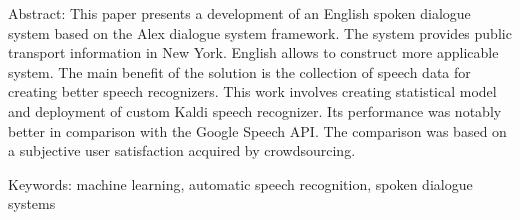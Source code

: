 \documentclass[12pt,a4paper]{report}
\let\openright=\clearpage
\def\chapwithtoc#1{
\chapter*{#1}
\addcontentsline{toc}{chapter}{#1}
}
\begin{document}
{Abstract:
This paper presents a development of an English spoken dialogue system based on the Alex dialogue system framework.
The system provides public transport information in New York.
English allows to construct more applicable system.
The main benefit of the solution is the collection of speech data for creating better speech recognizers.
This work involves creating statistical model and deployment of custom Kaldi speech recognizer.
Its performance was notably better in comparison with the Google Speech API.
The comparison was based on a subjective user satisfaction acquired by crowdsourcing. %





Keywords:
machine learning, automatic speech recognition, spoken dialogue systems

\vss}

\newpage


\openright
\pagestyle{plain}
\setcounter{page}{1}
\tableofcontents








% 





\listoftables






\openright
\end{document}
